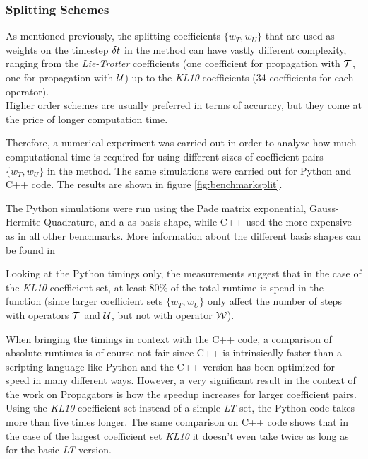 \subsubsection{Splitting Schemes}
%
As mentioned previously, the splitting coefficients $\{ w_T, w_U \}$ that are used as weights on the timestep $\delta t$ in the  method can have vastly different complexity, ranging from the \emph{Lie-Trotter} coefficients (one coefficient for propagation with $\mathcal{T}$, one for propagation with $\mathcal{U}$) up to the \emph{KL10} coefficients (34 coefficients for each operator). \\
Higher order schemes are usually preferred in terms of accuracy, but they come at the price of longer computation time.
\par\medskip
%
Therefore, a numerical experiment was carried out in order to analyze how much computational time is required for using different sizes of coefficient pairs $\{ w_T, w_U \}$ in the  method.
The same simulations were carried out for Python and C++ code.
The results are shown in figure \ref{fig:benchmarksplit}.
\par\medskip
%
The Python simulations were run using the Pade matrix exponential, Gauss-Hermite Quadrature, and a  as basis shape, while
C++ used the more expensive  as in all other benchmarks.
More information about the different basis shapes can be found in \cite{B_master_thesis}
\par\medskip
%
Looking at the Python timings only, the measurements suggest that in the case of the \emph{KL10} coefficient set, at least 80\% of the total runtime is spend in the  function (since larger coefficient sets $\{ w_T, w_U \}$ only affect the number of steps with operators $\mathcal{T}$ and $\mathcal{U}$, but not with operator $\mathcal{W}$).
\par\medskip
%
When bringing the timings in context with the C++ code, a comparison of absolute runtimes is of course not fair since C++ is intrinsically faster than a scripting language like Python and the C++ version has been optimized for speed in many different ways.
However, a very significant result in the context of the work on Propagators is how the speedup increases for larger coefficient pairs.
Using the \emph{KL10} coefficient set instead of a simple \emph{LT} set, the Python code takes more than five times longer.
The same comparison on C++ code shows that in the case of the largest coefficient set \emph{KL10} it doesn't even take twice as long as for the basic \emph{LT} version.
